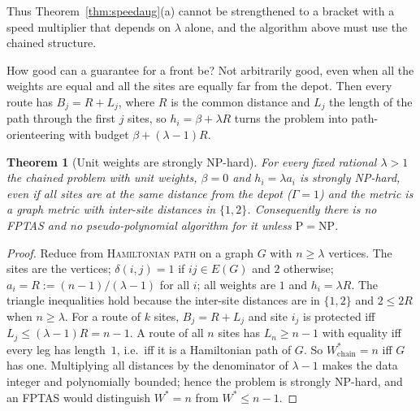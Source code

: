 \documentclass[pdflatex,sn-mathphys-ay]{sn-jnl}
\theoremstyle{thmstyleone}
\newtheorem{theorem}{Theorem}
\theoremstyle{thmstyletwo}
\theoremstyle{thmstylethree}
\begin{document}
Thus Theorem~\ref{thm:speedaug}(a) cannot be strengthened to a bracket with a speed
multiplier that depends on $\lambda$ alone, and the algorithm above must
use the chained structure.

How good can a guarantee for a front be? Not arbitrarily good, even when
all the weights are equal and all the sites are equally far from the
depot. Then every route has $B_j=R+L_j$, where $R$ is the common distance
and $L_j$ the length of the path through the first $j$ sites, so
$h_i=\beta+\lambda R$ turns the problem into path-orienteering with budget
$\beta+(\lambda-1)R$.

\begin{theorem}[Unit weights are strongly NP-hard]\label{thm:frontnp}
For every fixed rational $\lambda>1$ the chained problem with unit weights,
$\beta=0$ and $h_i=\lambda a_i$ is strongly NP-hard, even if all sites are at
the same distance from the depot ($\Gamma=1$) and the metric is a graph
metric with inter-site distances in $\{1,2\}$. Consequently there is no
FPTAS and no pseudo-polynomial algorithm for it unless $\mathrm P=\mathrm{NP}$.
\end{theorem}

\begin{proof}
Reduce from \textsc{Hamiltonian path} on a graph $G$ with $n\ge\lambda$
vertices. The sites are the vertices; $\delta(i,j)=1$ if $ij\in E(G)$ and $2$
otherwise; $a_i=R:=(n-1)/(\lambda-1)$ for all $i$; all weights are $1$ and
$h_i=\lambda R$. The triangle inequalities hold because the inter-site
distances are in $\{1,2\}$ and $2\le2R$ when $n\ge\lambda$. For a route of
$k$ sites, $B_j=R+L_j$ and site $i_j$ is protected iff $L_j\le(\lambda-1)R=n-1$.
A route of all $n$ sites has $L_n\ge n-1$ with equality iff every leg has
length~$1$, i.e.\ iff it is a Hamiltonian path of $G$. So $W^\ast_{\mathrm{chain}}=n$
iff $G$ has one. Multiplying all distances by the denominator of
$\lambda-1$ makes the data integer and polynomially bounded; hence the
problem is strongly NP-hard, and an FPTAS would distinguish
$W^\ast=n$ from $W^\ast\le n-1$.
\end{proof}
\end{document}
